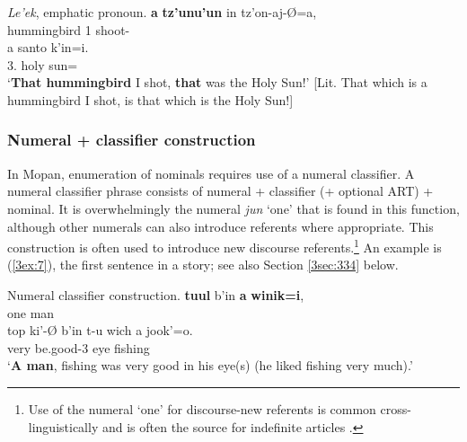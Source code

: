 \documentclass[output=paper]{langsci/langscibook}
\begin{document}
\begin{samepage}
\begin{exe}
\ex\label{3ex:6}
{\emph{Le'ek}}, emphatic pronoun. 
\exi{}
 	{\bf{a}} 	{\bf{tz'unu'un}}	 in 		tz'on-aj-\O=a, \\
	{}	{}	hummingbird	1{}	shoot-{} \\
\glt
\exi{}
 	a 	santo	k'in=i.  \\
	3.{}	{}	holy		sun={} \\
\glt	`{\bf{That hummingbird}} I shot, {\bf{that}} was the Holy Sun!' [Lit. That which is a hummingbird I shot, is that which is the Holy Sun!]
\end{exe}
\end{samepage}


\subsubsection{Numeral + classifier construction}\label{3sec:213}

In Mopan, enumeration of nominals requires use of a numeral classifier.  A numeral classifier phrase consists of numeral + classifier (+ optional ART) + nominal. %
It is overwhelmingly the numeral {\emph{jun}} `one' that is found in this function,
although other numerals can also introduce referents where appropriate. This construction is often used to introduce new discourse referents.\footnote{Use of the numeral `one' for discourse-new referents is common cross-linguistically and is often the source for indefinite articles \citep[see, e.\,g.,][]{lyons:99}.} An example is (\ref{3ex:7}), the first sentence in a story; see also Section \ref{3sec:334} below.

\begin{exe}
\ex\label{3ex:7}
Numeral classifier construction. 
\exi{}
 	{\bf{tuul}} 			b'in 		{\bf{a}} 	{\bf{winik=i}}, \\
	one		{}	{}		{}	man{} \\
\glt
\exi{}
\gll	top	ki'-{\O}			b'in		t-u			wich	a		jook'=o. \\
	very	be.good-3{}	{}	{}	eye	{}	fishing{} \\
\glt 	`{\bf{A man}}, fishing was very good in his eye(s) (he liked fishing very much).'
\end{exe}
\end{document}
